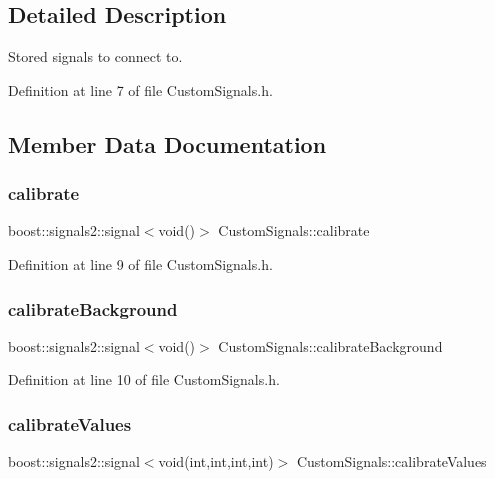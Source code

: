\subsection{Detailed Description}
Stored signals to connect to. 

Definition at line 7 of file Custom\+Signals.\+h.



\subsection{Member Data Documentation}
\mbox{\label{struct_custom_signals_affeb9cf3ae6f465af657b9e13f2f51e6}} 
\subsubsection{\texorpdfstring{calibrate}{calibrate}}
{\footnotesize\ttfamily boost\+::signals2\+::signal$<$void()$>$ Custom\+Signals\+::calibrate}



Definition at line 9 of file Custom\+Signals.\+h.

\mbox{\label{struct_custom_signals_aa853ceb0f87d27fb4d8318b98a5e36c6}} 
\subsubsection{\texorpdfstring{calibrate\+Background}{calibrateBackground}}
{\footnotesize\ttfamily boost\+::signals2\+::signal$<$void()$>$ Custom\+Signals\+::calibrate\+Background}



Definition at line 10 of file Custom\+Signals.\+h.

\mbox{\label{struct_custom_signals_a9383d26c828ce25b99c0a64fc8adcdc2}} 
\subsubsection{\texorpdfstring{calibrate\+Values}{calibrateValues}}
{\footnotesize\ttfamily boost\+::signals2\+::signal$<$void(int,int,int,int)$>$ Custom\+Signals\+::calibrate\+Values}



